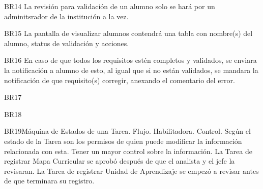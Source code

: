 \begin{BussinesRule}{BR14}{}
    \BRitem[Tipo:]
    \BRitem[Clase:]
    \BRitem[Nivel:]
    \BRitem[Descripción:]La revisión para validación de un alumno solo se hará por un adminitsrador  de la institución a la vez.
    
\end{BussinesRule}
\begin{BussinesRule}{BR15}{}
    \BRitem[Tipo:]
    \BRitem[Clase:]
    \BRitem[Nivel:]
    \BRitem[Descripción:]La pantalla de visualizar alumnos contendrá una tabla con nombre(s) del alumno, status de validación y acciones.
    
\end{BussinesRule}
\begin{BussinesRule}{BR16}{}
    \BRitem[Tipo:]
    \BRitem[Clase:]
    \BRitem[Nivel:]
    \BRitem[Descripción:]En caso de que todos los requisitos estén completos y validados, se enviara la notificación a alumno de esto, al igual que si no están validados, se mandara la notificación de que requisito(s) corregir, anexando el comentario del error. 
    
\end{BussinesRule}
\begin{BussinesRule}{BR17}{}
    \BRitem[Tipo:]
    \BRitem[Clase:]
    \BRitem[Nivel:]
    \BRitem[Descripción:]
    
\end{BussinesRule}
\begin{BussinesRule}{BR18}{}
    \BRitem[Tipo:]
    \BRitem[Clase:]
    \BRitem[Nivel:]
    \BRitem[Descripción:]
    
\end{BussinesRule}
\begin{BussinesRule}{BR19}{Máquina de Estados de una Tarea.}
    \BRitem[Tipo:] Flujo.
    \BRitem[Clase:] Habilitadora.
    \BRitem[Nivel:] Control.
    \BRitem[Descripción:] Según el estado de la Tarea son los permisos de quien puede modificar la información relacionada con esta.
     Tener un mayor control sobre la información.
     La Tarea de registrar Mapa Curricular se aprobó después de que el analista y el jefe la revisaran.
     La Tarea de registrar Unidad de Aprendizaje se empezó a revisar antes de que terminara su registro.
\end{BussinesRule}
